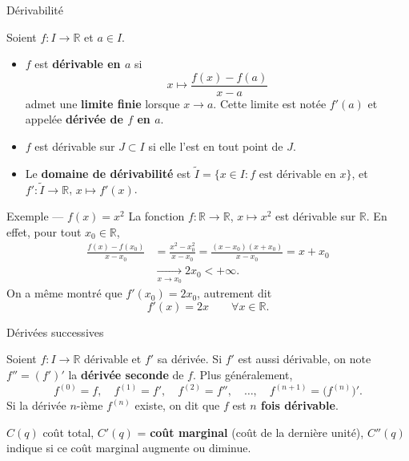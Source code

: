 \documentclass[aspectratio=169,11pt]{beamer}
\newcommand{\R}{\mathbb{R}}
\newcommand{\key}[1]{\textbf{\color{DarkBlue}#1}}
\newcommand{\important}[1]{\textbf{\color{DarkRed}#1}}
\newcommand{\fonc}[3]{#1\colon #2\to #3}
\begin{document}
\begin{frame}{Dérivabilité}
	\begin{definitionbox}
		Soient $\fonc{f}{I}{\R}$ et $a\in I$.
		\begin{itemize}
			\item $f$ est \key{dérivable en $a$} si
			\[
				x\longmapsto \frac{f(x)-f(a)}{x-a}
			\]
			admet une \important{limite finie} lorsque $x\to a$. Cette limite est notée $f'(a)$
			et appelée \key{dérivée de $f$ en $a$}.
			\item $f$ est dérivable sur $J\subset I$ si elle l'est en tout point de $J$.
			\item Le \key{domaine de dérivabilité} est
			$\widetilde I=\{x\in I : f\text{ est dérivable en }x\}$, et
			$\fonc{f'}{\widetilde I}{\R}$, $x\longmapsto f'(x)$.
		\end{itemize}
	\end{definitionbox}
\end{frame}

\begin{frame}{Exemple --- $f(x)=x^2$}
	La fonction $\fonc{f}{\R}{\R}$, $x\longmapsto x^2$ est dérivable sur $\R$.
	En effet, pour tout $x_0\in\R$,
	\begin{align*}
		\frac{f(x)-f(x_0)}{x-x_0}
		&= \frac{x^2-x_0^2}{x-x_0}
		= \frac{(x-x_0)(x+x_0)}{x-x_0}
		= x+x_0 \\
		&\xrightarrow[x\to x_0]{} 2x_0 < +\infty.
	\end{align*}
	On a même montré que $f'(x_0)=2x_0$, autrement dit
	\[
		f'(x)=2x \qquad \forall x\in\R.
	\]
\end{frame}

\begin{frame}{Dérivées successives}
	\begin{definitionbox}
		Soient $\fonc{f}{I}{\R}$ dérivable et $f'$ sa dérivée. Si $f'$ est aussi dérivable,
		on note $f''=(f')'$ la \key{dérivée seconde} de $f$. Plus généralement,
		\[
			f^{(0)}=f,\quad f^{(1)}=f',\quad f^{(2)}=f'',\quad \ldots,\quad
			f^{(n+1)}=\bigl(f^{(n)}\bigr)'.
		\]
		Si la dérivée $n$-ième $f^{(n)}$ existe, on dit que $f$ est \key{$n$ fois dérivable}.
	\end{definitionbox}
	\vspace{0.2cm}
	\begin{exemplebox}[En gestion]
		$C(q)$ coût total, $C'(q)$ = \key{coût marginal} (coût de la dernière unité),
		$C''(q)$ indique si ce coût marginal augmente ou diminue.
	\end{exemplebox}
\end{frame}
\end{document}
